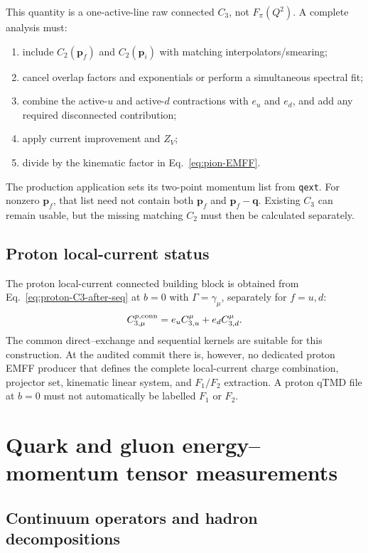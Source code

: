 \documentclass[11pt,a4paper]{article}
\numberwithin{equation}{section}
\newcommand{\code}[1]{%
  \ifmmode\text{\texttt{\detokenize{#1}}}\else\nolinkurl{#1}\fi}
\begin{document}
This quantity is a one-active-line raw connected \(C_3\), not
\(F_\pi(Q^2)\).  A complete analysis must:
\begin{enumerate}
  \item include \(C_2(\boldsymbol p_f)\) and
        \(C_2(\boldsymbol p_i)\) with matching interpolators/smearing;
  \item cancel overlap factors and exponentials or perform a simultaneous
        spectral fit;
  \item combine the active-\(u\) and active-\(d\) contractions with \(e_u\)
        and \(e_d\), and add any required disconnected contribution;
  \item apply current improvement and \(Z_V\);
  \item divide by the kinematic factor in Eq.~\eqref{eq:pion-EMFF}.
\end{enumerate}
The production application sets its two-point momentum list from
\code{qext}.  For nonzero \(\boldsymbol p_f\), that list need not contain both
\(\boldsymbol p_f\) and
\(\boldsymbol p_f-\boldsymbol q\).  Existing \(C_3\) can remain usable, but
the missing matching \(C_2\) must then be calculated separately.

\subsection{Proton local-current status}

The proton local-current connected building block is obtained from
Eq.~\eqref{eq:proton-C3-after-seq} at \(b=0\) with
\(\Gamma=\gamma_\mu\), separately for \(f=u,d\):
\begin{equation}
 C_{3,\mu}^{p,\rm conn}
 =e_u C_{3,u}^{\mu}+e_d C_{3,d}^{\mu}.
\end{equation}
The common direct--exchange and sequential kernels are suitable for this
construction.  At the audited commit there is, however, no dedicated proton
EMFF producer that defines the complete local-current charge combination,
projector set, kinematic linear system, and \(F_1/F_2\) extraction.  A proton
qTMD file at \(b=0\) must not automatically be labelled \(F_1\) or \(F_2\).

\section{Quark and gluon energy--momentum tensor measurements}

\subsection{Continuum operators and hadron decompositions}
\end{document}
